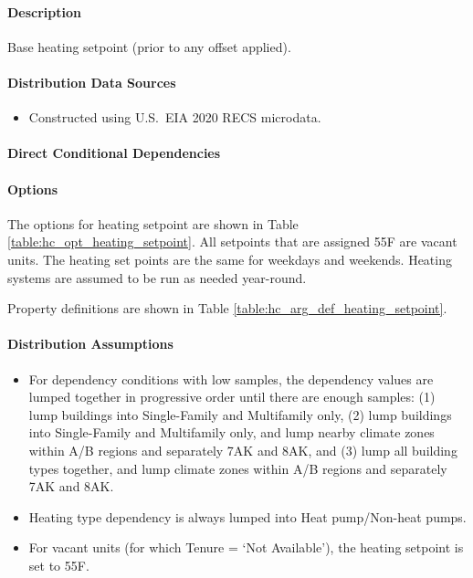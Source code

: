 \paragraph{Description}
% 
Base heating setpoint (prior to any offset applied).

\paragraph{Distribution Data Sources}
% 
\begin{itemize}
\item Constructed using U.S.~EIA 2020 RECS microdata.
\end{itemize}

\paragraph{Direct Conditional Dependencies}


\paragraph{Options}
The options for heating setpoint are shown in Table \ref{table:hc_opt_heating_setpoint}. All setpoints that are assigned 55\degree F are vacant units. The heating set points are the same for weekdays and weekends. Heating systems are assumed to be run as needed year-round.



Property definitions are shown in Table \ref{table:hc_arg_def_heating_setpoint}.



\paragraph{Distribution Assumptions}
% 
\begin{itemize}
    \item For dependency conditions with low samples, the dependency values are lumped together in progressive order until there are enough samples: (1) lump buildings into Single-Family and Multifamily only, (2) lump buildings into Single-Family and Multifamily only, and lump nearby climate zones within A/B regions and separately 7AK and 8AK, and (3) lump all building types together, and lump climate zones within A/B regions and separately 7AK and 8AK.
    \item Heating type dependency is always lumped into Heat pump/Non-heat pumps.
    \item For vacant units (for which Tenure = ‘Not Available’), the heating setpoint is set to 55\degree F.
\end{itemize}
